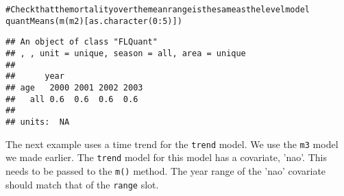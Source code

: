 \documentclass[a4paper,english,10pt]{article}\usepackage[]{graphicx}\usepackage[]{color}
\makeatletter
\newcommand{\hlnum}[1]{\textcolor[rgb]{0.2,0.2,0.2}{#1}}%
\newcommand{\hlcom}[1]{\textcolor[rgb]{0.2,0.267,0.4}{#1}}%
\newcommand{\hlopt}[1]{\textcolor[rgb]{0.2,0.2,0.2}{#1}}%
\newcommand{\hlstd}[1]{\textcolor[rgb]{0,0,0}{#1}}%
\newcommand{\hlkwd}[1]{\textcolor[rgb]{0.361,0.506,0.596}{#1}}%
\newenvironment{kframe}{%
 \def\at@end@of@kframe{}%
 \ifinner\ifhmode%
  \def\at@end@of@kframe{\end{minipage}}%
  \begin{minipage}{\columnwidth}%
 \fi\fi%
 \def\FrameCommand##1{\hskip\@totalleftmargin \hskip-\fboxsep
 \colorbox{shadecolor}{##1}\hskip-\fboxsep
     \hskip-\linewidth \hskip-\@totalleftmargin \hskip\columnwidth}%
 \MakeFramed {\advance\hsize-\width
   \@totalleftmargin\z@ \linewidth\hsize
   \@setminipage}}%
 {\par\unskip\endMakeFramed%
 \at@end@of@kframe}
\newenvironment{knitrout}{}{} %
\newcommand{\code}[1]{{\texttt{#1}}}
\makeatother
\begin{document}
\begin{knitrout}
\begin{kframe}
\begin{alltt}
\hlcom{# Check that the mortality over the mean range is the same as the level model}
\hlkwd{quantMeans}\hlstd{(}\hlkwd{m}\hlstd{(m2)[}\hlkwd{as.character}\hlstd{(}\hlnum{0}\hlopt{:}\hlnum{5}\hlstd{)])}
\end{alltt}
\begin{verbatim}
## An object of class "FLQuant"
## , , unit = unique, season = all, area = unique
## 
##      year
## age   2000 2001 2002 2003
##   all 0.6  0.6  0.6  0.6 
## 
## units:  NA
\end{verbatim}
\end{kframe}
\end{knitrout}

The next example uses a time trend for the \code{trend} model. We use the \code{m3} model we made earlier. The \code{trend} model for this model has a covariate, 'nao'. This needs to be passed to the \code{m()} method. The year range of the 'nao' covariate should match that of the \code{range} slot.
\end{document}
